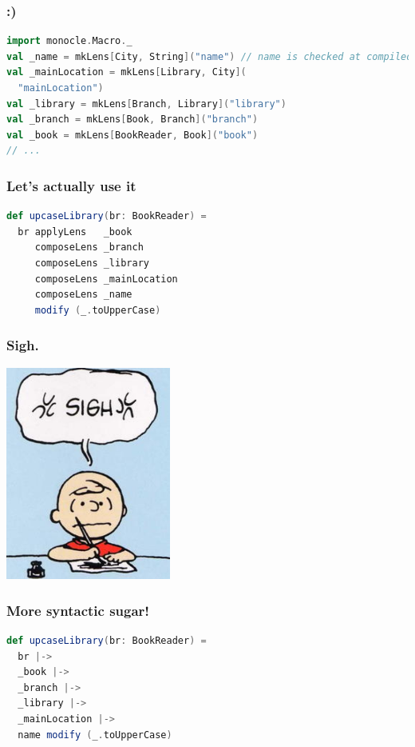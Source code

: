 \documentclass{beamer}
\begin{document}
\begin{frame}[fragile]
  \frametitle{:)}
  \begin{lstlisting}[language=scala]
import monocle.Macro._
val _name = mkLens[City, String]("name") // name is checked at compiled time to be a valid accessor
val _mainLocation = mkLens[Library, City](
  "mainLocation")
val _library = mkLens[Branch, Library]("library")
val _branch = mkLens[Book, Branch]("branch")
val _book = mkLens[BookReader, Book]("book")
// ...
  \end{lstlisting}
\end{frame}

\begin{frame}[fragile]
  \frametitle{Let's actually use it}
  \begin{lstlisting}[language=scala]
def upcaseLibrary(br: BookReader) =
  br applyLens   _book
     composeLens _branch
     composeLens _library
     composeLens _mainLocation
     composeLens _name
     modify (_.toUpperCase)
  \end{lstlisting}
\end{frame}

\begin{frame}[fragile]
  \frametitle{Sigh.}
  \begin{center}
    \includegraphics[height=7cm]{img/sigh.png}
  \end{center}
\end{frame}

\begin{frame}[fragile]
  \frametitle{More syntactic sugar!}
  \begin{lstlisting}[language=scala]
def upcaseLibrary(br: BookReader) =
  br |->
  _book |->
  _branch |->
  _library |->
  _mainLocation |->
  name modify (_.toUpperCase)
  \end{lstlisting}
\end{frame}
\end{document}

